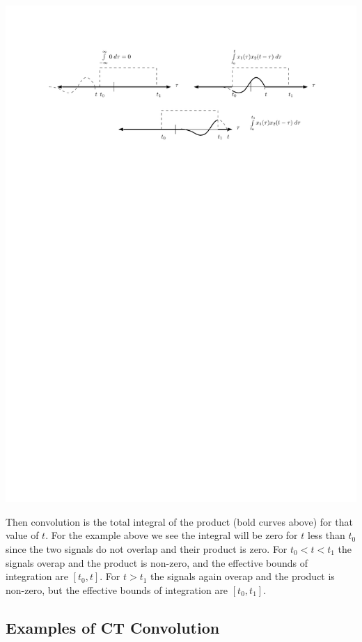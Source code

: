 \begin{center}
  \includegraphics[scale=1]{graphics/convolution-explain4.pdf}
\end{center}
Then convolution is the total integral of the product (bold curves above) for that value of $t$. For the example above we see the integral will be zero for $t$ less than $t_0$ since the two signals do not overlap and their product is zero. For $t_0 < t < t_1$ the signals overap and the product is non-zero, and the effective bounds of integration are $[t_0,t]$. For $t > t_1$ the signals again overap and the product is non-zero, but the effective bounds of integration are $[t_0,t_1]$. 

\subsection{Examples of CT Convolution}


